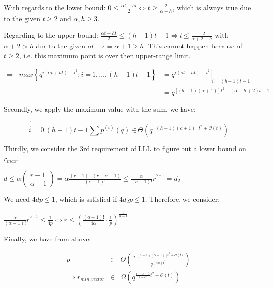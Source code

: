 With regards to the lower bound: $0\leq\frac{\alpha t+ht}{2}\Leftrightarrow t\geq\frac{2}{\alpha+h}$,
which is always true due to the given $t\geq2$ and $\alpha,h\geq3$.

Regarding to the upper bound: $\frac{\alpha t+ht}{2}\leq(h-1)t-1\Leftrightarrow t\leq\frac{-2}{\alpha+2-h}$
with $\alpha+2>h$ due to the given $\alpha l+\epsilon=\alpha+1\geq h$.
This cannot happen because of $t\geq2$, i.e. this maximum point is
over then upper-range limit.

\begin{eqnarray*}
\Rightarrow & max\left\{ q^{i(\alpha t+ht)-i^{2}}:i=1,\ldots,(h-1)t-1\right\}  & =\left.q^{i(\alpha t+ht)-i^{2}}\right|_{i=(h-1)t-1}\\
 &  & =q^{\left[\left(h-1\right)\left(\alpha+1\right)\right]t^{2}-\left(\alpha-h+2\right)t-1}
\end{eqnarray*}

Secondly, we apply the maximum value with the sum, we have:

\[
\stackrel[i=0]{(h-1)t-1}{\mathop{\sum}}p^{(i)}(q)\in\Theta\left(q^{\left[\left(h-1\right)\left(\alpha+1\right)\right]t^{2}+\mathcal{O}(t)}\right)
\]

Thirdly, we consider the 3rd requirement of LLL to figure out a lower
bound on $r_{max}$:

$d\leq\alpha\left(\begin{array}{c}
r-1\\
\alpha-1
\end{array}\right)=\alpha\frac{\left(r-1\right)\ldots\left(r-\alpha+1\right)}{\left(\alpha-1\right)!}\leq\frac{\alpha}{\left(\alpha-1\right)!}r^{^{\alpha-1}}=d_{2}$

We need $4dp\leq1$, which is satisfied if $4d_{2}p\leq1$. Therefore,
we consider:

$\frac{\alpha}{\left(\alpha-1\right)!}r^{^{\alpha-1}}\leq\frac{1}{4p}\Leftrightarrow r\leq\left(\frac{\left(\alpha-1\right)!}{4\alpha}\cdot\frac{1}{p}\right)^{\frac{1}{\alpha-1}}$

Finally, we have from above:

\begin{eqnarray*}
p & \in & \Theta\left(\frac{q^{\left[\left(h-1\right)\left(\alpha+1\right)\right]t^{2}+\mathcal{O}(t)}}{q^{\left(\alpha h\right)t^{2}}}\right)\\
\Rightarrow r_{min,vector} & \in & \Omega\left(q^{\frac{h-\alpha-1}{1-\alpha}t^{2}+\mathcal{O}(t)}\right)
\end{eqnarray*}



